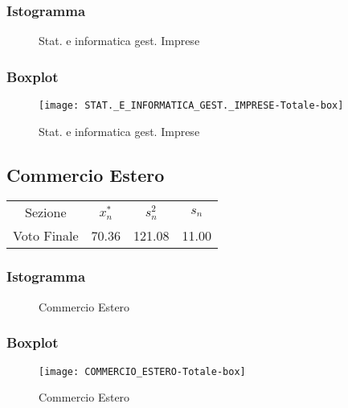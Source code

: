 \subsubsection{Istogramma}
\begin{figure}[!h]
  \caption{Stat. e informatica gest. Imprese}
\end{figure}

\subsubsection{Boxplot}
\begin{figure}[!h]
  \centering
  \texttt{[image: STAT.\_E\_INFORMATICA\_GEST.\_IMPRESE-Totale-box]}
  \caption{Stat. e informatica gest. Imprese}
\end{figure}
\restoregeometry
\clearpage

\thispagestyle{empty} %
\subsection{Commercio Estero}

\begin{center}
\begin{tabular}{cccc}
  \toprule
  Sezione & \(x_{n}^{*}\) & \(s_n^2\) & \(s_n\) \\
  Voto Finale & 70.36 & 121.08 & 11.00 \\
  \bottomrule
\end{tabular}
\end{center}

\subsubsection{Istogramma}
\begin{figure}[!h]
  \caption{Commercio Estero}
\end{figure}

\subsubsection{Boxplot}
\begin{figure}[!h]
  \centering
  \texttt{[image: COMMERCIO\_ESTERO-Totale-box]}
  \caption{Commercio Estero}
\end{figure}
\restoregeometry
\clearpage

